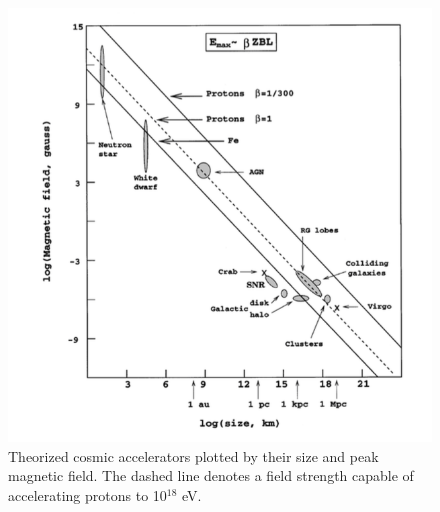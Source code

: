 \begin{figure}
\label{fig:cosmicAccel}
	\includegraphics[width=\textwidth]{figures/cosmicAccelerators}
	\caption{Theorized cosmic accelerators plotted by their size and peak magnetic field.  The dashed line denotes a field strength capable of accelerating protons to 10${^18}$ eV. \cite{RevModPhys.71.S33} }
\end{figure}


